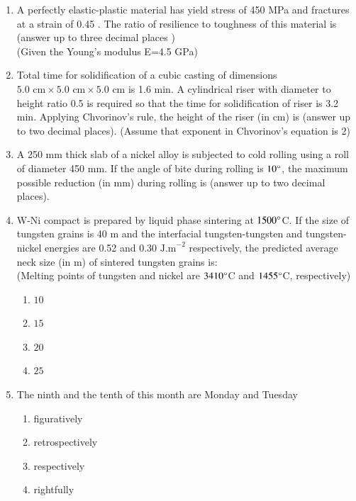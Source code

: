 \documentclass[journal]{IEEEtran}
\theoremstyle{remark}
\begin{document}
\begin{enumerate}
\item A perfectly elastic-plastic material has yield stress of 450 MPa  and fractures at a strain of 0.45 . The ratio of resilience to toughness of this material is \underline {\hspace{2cm}}(answer up to three decimal places )\\
(Given the Young's modulus E=4.5 GPa) \hfill{}

\item Total time for solidification of a cubic casting of dimensions $5.0\text{ cm} \times 5.0\text{ cm} \times 5.0\text{ cm}$ is 1.6 min. A cylindrical riser with diameter to height ratio 0.5 is required so that the time for solidification of riser is 3.2 min. Applying Chvorinov's rule, the height of the riser (in cm) is\underline {\hspace{2cm}} (answer up to two decimal places). (Assume that exponent in Chvorinov's equation is 2) \hfill{}

\item A 250 mm thick slab of a nickel alloy is subjected to cold rolling using a roll of diameter 450 mm. If the angle of bite during rolling is $10\degree$, the maximum possible reduction (in mm) during rolling is \underline {\hspace{2cm}} (answer up to two decimal places). \hfill{}

\item W-Ni compact is prepared by liquid phase sintering at $1500\degree$C. If the size of tungsten grains is 40 \textmu m and the interfacial tungsten-tungsten and tungsten-nickel energies are 0.52 and $0.30 \text{ J.m}^{-2}$ respectively, the predicted average neck size (in \textmu m) of sintered tungsten grains is:\\ (Melting points of tungsten and nickel are $3410\degree$C and $1455\degree$C, respectively) \hfill{}
\begin{multicols}{4}
\begin{enumerate}
    \item $10$
    \item $15$
    \item $20$
    \item $25$
\end{enumerate}
\end{multicols}



\item The ninth and the tenth of this month are Monday and Tuesday \underline {\hspace{2cm}}\hfill{}
\begin{multicols}{4}
\begin{enumerate}
    \item figuratively
    \item retrospectively
    \item respectively
    \item rightfully
\end{enumerate}
\end{multicols}


\end{enumerate}
\end{document}
